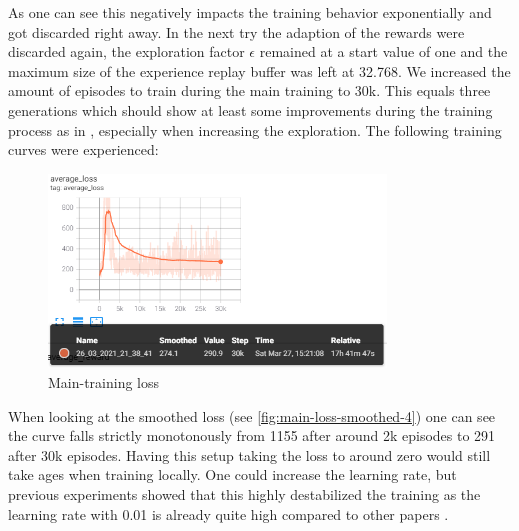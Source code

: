 As one can see this negatively impacts the training behavior exponentially and got discarded right away. In the next try the adaption of the rewards were discarded again, the exploration factor $\epsilon$ remained at a start value of one and the maximum size of the experience replay buffer was left at 32.768. We increased the amount of episodes to train during the main training to 30k. This equals three generations which should show at least some improvements during the training process as in \cite{Kormelink2018}, especially when increasing the exploration. The following training curves were experienced: 

\begin{figure}[ht]
	\centering
	\includegraphics[width=0.8\textwidth]{figures/training4-main-loss-smooth.PNG}
	\caption{Main-training loss}
	\label{fig:main-loss-smoothed-4}
\end{figure}

When looking at the smoothed loss (see \autoref{fig:main-loss-smoothed-4}) one can see the curve falls strictly monotonously from 1155 after around 2k episodes to 291 after 30k episodes. Having this setup taking the loss to around zero would still take ages when training locally. One could increase the learning rate, but previous experiments showed that this highly destabilized the training as the learning rate with 0.01 is already quite high compared to other papers \cite{Franca2019, Kormelink2018}. 

\newpage

